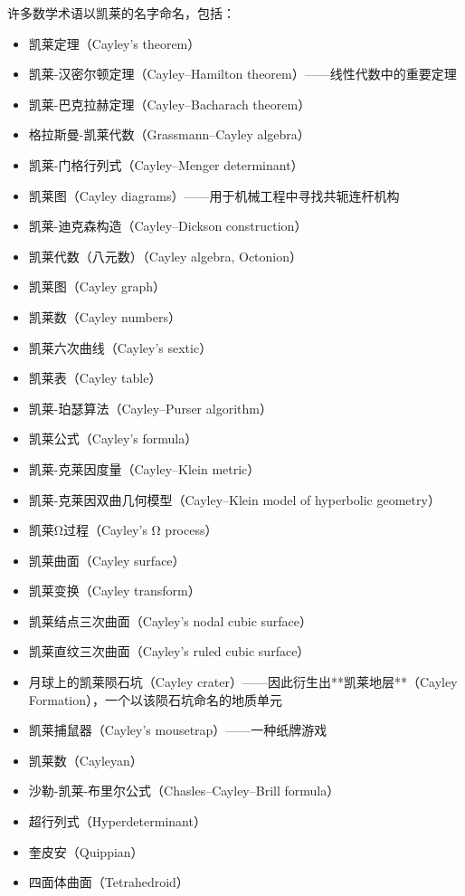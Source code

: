 许多数学术语以凯莱的名字命名，包括：  
\begin{itemize}
\item 凯莱定理（Cayley's theorem）  
\item 凯莱-汉密尔顿定理（Cayley–Hamilton theorem）——线性代数中的重要定理  
\item 凯莱-巴克拉赫定理（Cayley–Bacharach theorem）  
\item 格拉斯曼-凯莱代数（Grassmann–Cayley algebra）  
\item 凯莱-门格行列式（Cayley–Menger determinant）  
\item 凯莱图（Cayley diagrams）——用于机械工程中寻找共轭连杆机构  
\item 凯莱-迪克森构造（Cayley–Dickson construction）  
\item 凯莱代数（八元数）（Cayley algebra, Octonion）  
\item 凯莱图（Cayley graph）  
\item 凯莱数（Cayley numbers）  
\item 凯莱六次曲线（Cayley's sextic）  
\item 凯莱表（Cayley table）  
\item 凯莱-珀瑟算法（Cayley–Purser algorithm）  
\item 凯莱公式（Cayley's formula）  
\item 凯莱-克莱因度量（Cayley–Klein metric）  
\item 凯莱-克莱因双曲几何模型（Cayley–Klein model of hyperbolic geometry）  
\item 凯莱Ω过程（Cayley's Ω process）  
\item 凯莱曲面（Cayley surface）  
\item 凯莱变换（Cayley transform）  
\item 凯莱结点三次曲面（Cayley's nodal cubic surface）  
\item 凯莱直纹三次曲面（Cayley's ruled cubic surface）  
\item 月球上的凯莱陨石坑（Cayley crater）——因此衍生出**凯莱地层**（Cayley Formation），一个以该陨石坑命名的地质单元  
\item 凯莱捕鼠器（Cayley's mousetrap）——一种纸牌游戏  
\item 凯莱数（Cayleyan）  
\item 沙勒-凯莱-布里尔公式（Chasles–Cayley–Brill formula）  
\item 超行列式（Hyperdeterminant）  
\item 奎皮安（Quippian）  
\item 四面体曲面（Tetrahedroid）  
\end{itemize}
